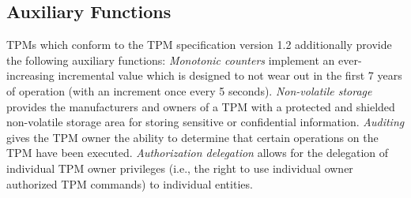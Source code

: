 \documentclass[runningheads]{llncs}
\begin{document}
\subsection{Auxiliary Functions}
TPMs which conform to the TPM specification version 1.2 additionally provide
the following auxiliary functions:
\emph{Monotonic counters} implement an ever-increasing incremental value which
is designed to not wear out in the first 7 years of operation (with an
increment once every 5 seconds).
\emph{Non-volatile storage} provides the manufacturers and owners of a TPM
with a protected and shielded non-volatile storage area for storing sensitive
or confidential information.
\emph{Auditing} gives the TPM owner the ability to determine that certain
operations on the TPM have been executed.
\emph{Authorization delegation} allows for the delegation of individual TPM
owner privileges (i.e., the right to use individual owner authorized TPM
commands) to individual entities.
\end{document}
